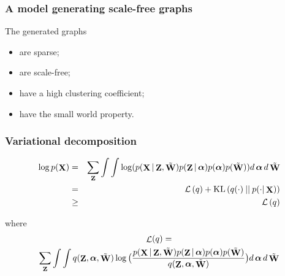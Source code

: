 \documentclass{beamer}
\DeclareMathOperator{\bZ}{{\bf Z}}
\DeclareMathOperator{\bX}{{\bf X}}
\DeclareMathOperator{\bW}{{\bf W}}
\DeclareMathOperator{\btW}{\tilde{\bW}}
\DeclareMathOperator{\LowerBound}{\mathcal{L}}
\DeclareMathOperator{\balpha}{\boldsymbol{\alpha}}
\DeclareMathOperator{\KL}{\mathrm{KL}}
\begin{document}
\begin{frame}
\frametitle{A model generating scale-free graphs}

The generated graphs
\begin{itemize}
\item are sparse;
\item are scale-free;
\item have a high clustering coefficient;
\item have the small world property.
\end{itemize}




\vfill
{}


\end{frame}






\begin{frame}
\frametitle{Variational decomposition}

\begin{eqnarray*}
 \log p(\bX)  & = &  \sum_{\bZ} \int \int \log(p(\bX|\bZ,\btW)p(\bZ|\balpha)p(\balpha)p(\btW)) d\balpha d\btW \\
              & = & \mathcal{L}\left(q\right) + \KL\left(q(\cdot)\:||\:
        p(\cdot|\bX)\right)\\
              & \geq & \mathcal{L}\left(q\right) 
 \end{eqnarray*}

 where
      \begin{multline*}
 \LowerBound(q) = \\
\sum_{\bZ} \int \int q(\bZ, \balpha, \btW) \log\big(\frac{p(\bX|\bZ,\btW)p(\bZ|\balpha)p(\balpha)p(\btW)}{q(\bZ, \balpha, \btW)}\big) d\balpha d\btW
    \end{multline*}


\end{frame}
\end{document}
